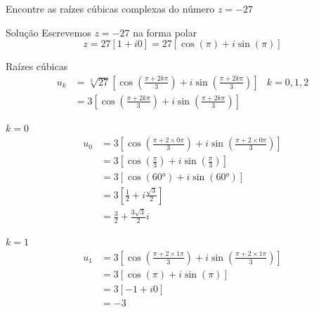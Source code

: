 \begin{question}
  Encontre as raízes cúbicas complexas do número \( z = -27 \)
\end{question}

\begin{resolution}{Solução}
  Escrevemos \( z = -27 \) na forma polar
  \[
    z
    = 27 [1 + i0]
    = 27 \left[ \cos\left(\pi\right) + i \sin\left(\pi\right) \right]
  \]
\end{resolution}

\begin{resolution}{Raízes cúbicas}
\begin{align*}
  u_k
  & = \sqrt[3]{27} \left[
  \cos\left(\frac{\pi+2k\pi}{3}\right)
  + i \sin\left(\frac{\pi+2k\pi}{3}\right)
  \right]
  & k = 0, 1, 2    \\
  & = 3 \left[
  \cos\left(\frac{\pi+2k\pi}{3}\right)
  + i \sin\left(\frac{\pi+2k\pi}{3}\right)
  \right]
\end{align*}
\end{resolution}

\begin{resolution}{\(k=0\)}
\begin{align*}
  u_0
  & = 3 \left[
  \cos\left( \frac{\pi+2\times 0\pi}{3} \right)
  + i \sin\left( \frac{\pi+2\times 0\pi}{3} \right)
  \right] \\
  & = 3 \left[
  \cos\left( \frac{\pi}{3} \right)
  + i \sin\left( \frac{\pi}{3} \right)
  \right] \\
  & = 3 \left[
  \cos\left( \ang{60} \right)
  + i \sin\left( \ang{60} \right)
  \right] \\
  & = 3 \left[
  \frac{1}{2}
  + i \frac{\sqrt{3}}{2}
  \right] \\
  & =  \frac{3}{2} + \frac{3\sqrt{3}}{2} i
\end{align*}
\end{resolution}

\begin{resolution}{\(k=1\)}
\begin{align*}
  u_1
  & = 3 \left[
  \cos\left( \frac{\pi+2\times 1\pi}{3} \right)
  + i \sin\left( \frac{\pi+2\times 1\pi}{3} \right)
  \right] \\
  & = 3 \left[
  \cos\left( \pi \right)
  + i \sin\left( \pi \right)
  \right] \\
  & = 3 \left[ -1 + i0 \right] \\
  & = -3
\end{align*}

\end{resolution}

